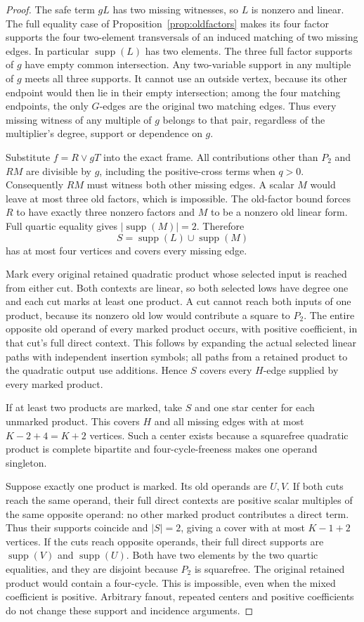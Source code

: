 \documentclass[11pt]{article}
\newcommand{\supp}{\operatorname{supp}}
\theoremstyle{definition}
\theoremstyle{remark}
\begin{document}
\begin{proof}
The safe term $gL$ has two missing witnesses, so $L$ is nonzero and linear.
The full equality case of Proposition~\ref{prop:oldfactors} makes its four
factor supports the four two-element transversals of an induced matching
of two missing edges. In particular $\supp(L)$ has two elements. The three
full factor supports of $g$ have empty common intersection. Any two-variable
support in any multiple of $g$ meets all three supports. It cannot use an
outside vertex, because its other endpoint would then lie in their empty
intersection; among the four matching endpoints, the only $G$-edges are
the original two matching edges. Thus every missing witness of any
multiple of $g$ belongs to that pair, regardless of the multiplier's
degree, support or dependence on $g$.

Substitute $f=R\vee gT$ into the exact frame. All contributions other than
$P_2$ and $RM$ are divisible by $g$, including the positive-cross terms
when $q>0$. Consequently $RM$ must witness both other missing edges.
A scalar $M$ would leave at most three old factors, which is impossible.
The old-factor bound forces $R$ to have exactly three nonzero factors and
$M$ to be a nonzero old linear form. Full quartic equality gives
$|\supp(M)|=2$. Therefore
\[
 S=\supp(L)\cup\supp(M)
\]
has at most four vertices and covers every missing edge.

Mark every original retained quadratic product whose selected input is
reached from either cut. Both contexts are linear, so both selected lows
have degree one and each cut marks at least one product. A cut cannot
reach both inputs of one product, because its nonzero old low would
contribute a square to $P_2$. The entire opposite old operand of every
marked product occurs, with positive coefficient, in that cut's full
direct context. This follows by expanding the actual selected linear
paths with independent insertion symbols; all paths from a retained
product to the quadratic output use additions. Hence $S$ covers every
$H$-edge supplied by every marked product.

If at least two products are marked, take $S$ and one star center for each
unmarked product. This covers $H$ and all missing edges with at most
$K-2+4=K+2$ vertices. Such a center exists because a squarefree quadratic
product is complete bipartite and four-cycle-freeness makes one operand
singleton.

Suppose exactly one product is marked. Its old operands are $U,V$.
If both cuts reach the same operand, their full direct contexts are
positive scalar multiples of the same opposite operand: no other marked
product contributes a direct term. Thus their supports coincide and
$|S|=2$, giving a cover with at most $K-1+2$ vertices. If the cuts reach
opposite operands, their full direct supports are $\supp(V)$ and
$\supp(U)$. Both have two elements by the two quartic equalities, and they
are disjoint because $P_2$ is squarefree. The original retained product
would contain a four-cycle. This is impossible, even when the mixed
coefficient is positive. Arbitrary fanout, repeated centers and positive
coefficients do not change these support and incidence arguments.
\end{proof}
\end{document}
